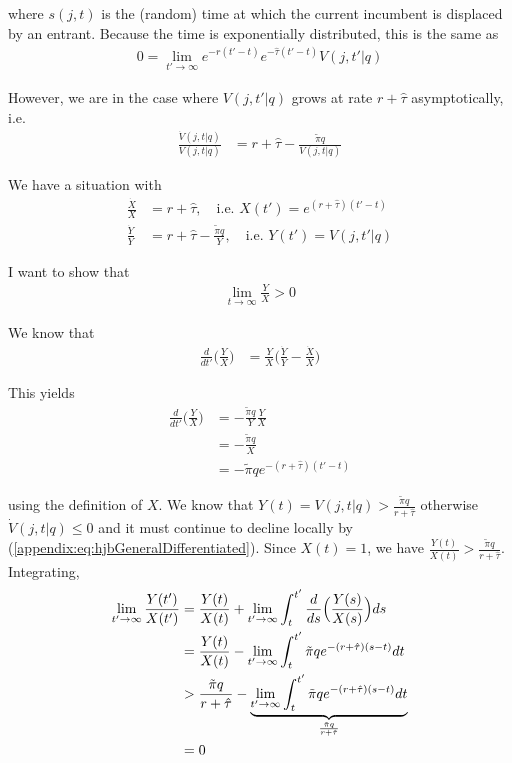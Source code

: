 \documentclass[11pt,english]{article}
\theoremstyle{definition}
\begin{document}
where $s(j,t)$ is the (random) time at which the current incumbent is displaced by an entrant. Because the time is exponentially distributed, this is the same as
\begin{align}
	0 = \lim_{t' \to \infty} e^{-r(t'-t)} e^{-\hat{\tau} (t'-t)} V(j,t'|q)
\end{align}

However, we are in the case where $V(j,t'|q)$ grows at rate $r + \hat{\tau}$ asymptotically, i.e.
\begin{align}
	\frac{\dot{V}(j,t|q)}{V(j,t|q)} &= r + \hat{\tau} - \frac{\tilde{\pi}q}{V(j,t|q)}
\end{align}

We have a situation with 
\begin{align}
	\frac{\dot{X}}{X} &= r + \hat{\tau}, \quad  \text{i.e. } X(t') = e^{(r + \hat{\tau})(t' - t)} \\
	\frac{\dot{Y}}{Y} &= r + \hat{\tau} - \frac{\tilde{\pi}q}{Y}, \quad \text{i.e. } Y(t') = V(j,t'|q)
\end{align}

I want to show that
\begin{align}
	\lim_{t \to \infty} \frac{Y}{X} > 0 
\end{align}

We know that
\begin{align}
	\frac{d}{dt'}\Big(\frac{Y}{X} \Big) &= \frac{Y}{X} \Big( \frac{\dot{Y}}{Y} - \frac{\dot{X}}{X} \Big)
\end{align}

This yields
\begin{align}
	\frac{d}{dt'} \Big(\frac{Y}{X} \Big) &= -\frac{\tilde{\pi}q}{Y} \frac{Y}{X}  \\
	&= - \frac{\tilde{\pi}q}{X} \\
	&= - \tilde{\pi} q e^{-(r +\hat{\tau}) (t' - t)}
\end{align}

using the definition of $X$. We know that $Y(t) = V(j,t|q) > \frac{\tilde{\pi} q}{r + \hat{\tau}}$ otherwise $\dot{V}(j,t|q) \le 0$ and it must continue to decline locally by (\ref{appendix:eq:hjbGeneralDifferentiated}). Since $X(t) = 1$, we have $\frac{Y(t)}{X(t)} > \frac{\tilde{\pi} q}{r + \hat{\tau}}$. Integrating, 
\begin{align}
	\lim_{t' \to \infty} \frac{Y(t')}{X(t')} &=  \frac{Y(t)}{X(t)} + \lim_{t' \to \infty} \int_t^{t'} \frac{d}{ds} \Big(\frac{Y(s)}{X(s)} \Big) ds \\
	&= \frac{Y(t)}{X(t)} - \lim_{t' \to \infty} \int_t^{t'}  \tilde{\pi} q e^{-(r +\hat{\tau}) (s-t)} dt \\
	&> \frac{\tilde{\pi} q}{r + \hat{\tau}} - \underbrace{\lim_{t' \to \infty} \int_t^{t'}  \tilde{\pi} q e^{-(r +\hat{\tau}) (s-t)} dt}_{\mathclap{\frac{\tilde{\pi}q}{r + \hat{\tau}}}} \\ 
	&= 0
\end{align}
\end{document}
